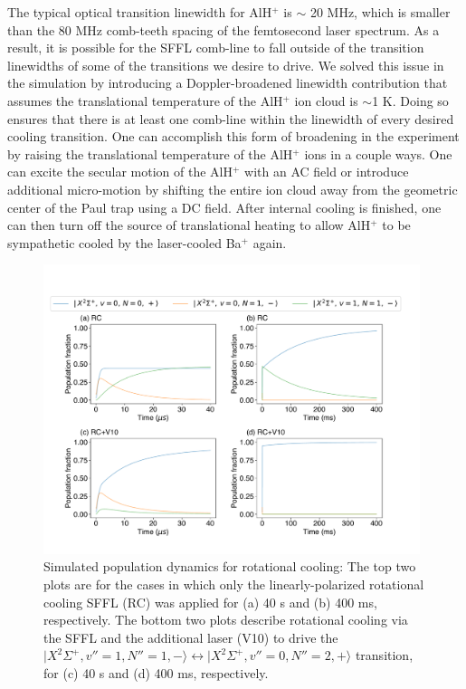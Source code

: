 \documentclass[nofootinbib,aip,jcp,reprint]{revtex4-1}
\begin{document}
The typical optical transition linewidth for AlH$^+$ is $\sim$ 20 MHz, which is smaller than the 80 MHz comb-teeth spacing of the femtosecond laser spectrum. As a result, it is possible for the SFFL comb-line to fall outside of the transition linewidths of some of the transitions we desire to drive. We solved this issue in the simulation by introducing a Doppler-broadened linewidth contribution that assumes the translational temperature of the AlH$^+$ ion cloud is $\sim$1 K. Doing so ensures that there is at least one comb-line within the linewidth of every desired cooling transition. One can accomplish this form of broadening in the experiment by raising the translational temperature of the AlH$^+$ ions in a couple ways. One can excite the secular motion of the AlH$^+$ with an AC field or introduce additional micro-motion by shifting the entire ion cloud away from the geometric center of the Paul trap using a DC field. After internal cooling is finished, one can then turn off the source of translational heating to allow AlH$^+$ to be sympathetic cooled by the laser-cooled Ba$^+$ again.

\begin{figure}[htbp!]
  \centering
  \includegraphics[width=11cm]{RC_RCV10}
  \caption
  {Simulated population dynamics for rotational cooling: The top two plots are for the cases in which only the linearly-polarized rotational cooling SFFL (RC) was applied for (a) 40 {\micro}s and (b) 400 ms, respectively. The bottom two plots describe rotational cooling via the SFFL and the additional laser (V10) to drive the $\lvert X^2\Sigma^+, v''=1, N''=1, -\rangle \leftrightarrow \lvert X^2\Sigma^+, v''=0, N''=2, +\rangle$ transition, for (c) 40 {\micro}s and (d) 400 ms, respectively.
  }\label{RC_RCV10}
\end{figure}
\end{document}
